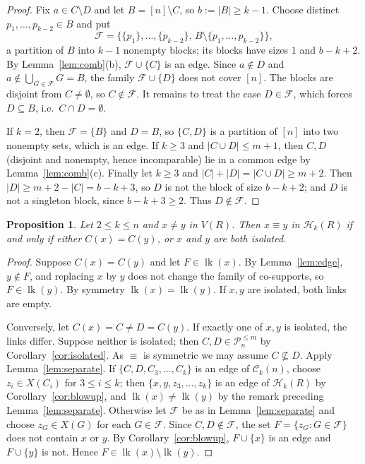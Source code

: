 \documentclass{amsart}
\newtheorem{proposition}[theorem]{Proposition}
\theoremstyle{definition}
\theoremstyle{remark}
\newcommand{\lk}{\operatorname{lk}}
\newcommand{\cC}{\mathcal{C}}
\newcommand{\cF}{\mathcal{F}}
\newcommand{\cP}{\mathcal{P}}
\newcommand{\cH}{\mathcal{H}}
\newcommand{\nn}{[n]}
\begin{document}
\begin{proof}
Fix $a\in C\setminus D$ and let $B=\nn\setminus C$, so $b:=|B|\ge k-1$. Choose distinct $p_1,\dots,p_{k-2}\in B$ and put
\[
\cF=\bigl\{\{p_1\},\dots,\{p_{k-2}\},\,B\setminus\{p_1,\dots,p_{k-2}\}\bigr\},
\]
a partition of $B$ into $k-1$ nonempty blocks; its blocks have sizes $1$ and $b-k+2$. By Lemma~\ref{lem:comb}(b), $\cF\cup\{C\}$ is an edge. Since $a\notin D$ and $a\notin\bigcup_{G\in\cF}G=B$, the family $\cF\cup\{D\}$ does not cover $\nn$. The blocks are disjoint from $C\ne\emptyset$, so $C\notin\cF$. It remains to treat the case $D\in\cF$, which forces $D\subseteq B$, i.e.\ $C\cap D=\emptyset$.

If $k=2$, then $\cF=\{B\}$ and $D=B$, so $\{C,D\}$ is a partition of $\nn$ into two nonempty sets, which is an edge. If $k\ge3$ and $|C\cup D|\le m+1$, then $C,D$ (disjoint and nonempty, hence incomparable) lie in a common edge by Lemma~\ref{lem:comb}(c). Finally let $k\ge3$ and $|C|+|D|=|C\cup D|\ge m+2$. Then $|D|\ge m+2-|C|=b-k+3$, so $D$ is not the block of size $b-k+2$; and $D$ is not a singleton block, since $b-k+3\ge 2$. Thus $D\notin\cF$.
\end{proof}

\begin{proposition}\label{prop:equiv}
Let $2\le k\le n$ and $x\ne y$ in $V(R)$. Then $x\equiv y$ in $\cH_k(R)$ if and only if either $C(x)=C(y)$, or $x$ and $y$ are both isolated.
\end{proposition}

\begin{proof}
Suppose $C(x)=C(y)$ and let $F\in\lk(x)$. By Lemma~\ref{lem:edge}, $y\notin F$, and replacing $x$ by $y$ does not change the family of co-supports, so $F\in\lk(y)$. By symmetry $\lk(x)=\lk(y)$. If $x,y$ are isolated, both links are empty.

Conversely, let $C(x)=C\neq D=C(y)$. If exactly one of $x,y$ is isolated, the links differ. Suppose neither is isolated; then $C,D\in\cP_n^{\le m}$ by Corollary~\ref{cor:isolated}. As $\equiv$ is symmetric we may assume $C\not\subseteq D$. Apply Lemma~\ref{lem:separate}.
If $\{C,D,C_3,\dots,C_k\}$ is an edge of $\cC_k(n)$, choose $z_i\in X(C_i)$ for $3\le i\le k$; then $\{x,y,z_3,\dots,z_k\}$ is an edge of $\cH_k(R)$ by Corollary~\ref{cor:blowup}, and $\lk(x)\ne\lk(y)$ by the remark preceding Lemma~\ref{lem:separate}.
Otherwise let $\cF$ be as in Lemma~\ref{lem:separate} and choose $z_G\in X(G)$ for each $G\in\cF$. Since $C,D\notin\cF$, the set $F=\{z_G: G\in\cF\}$ does not contain $x$ or $y$. By Corollary~\ref{cor:blowup}, $F\cup\{x\}$ is an edge and $F\cup\{y\}$ is not. Hence $F\in\lk(x)\setminus\lk(y)$.
\end{proof}
\end{document}

